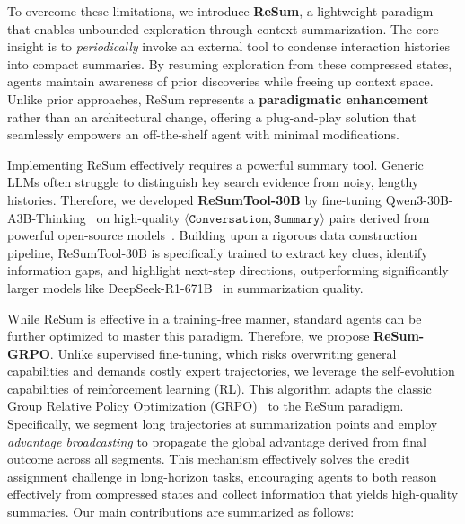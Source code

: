 To overcome these limitations, we introduce \textbf{ReSum}, a lightweight paradigm that enables unbounded exploration through context summarization. The core insight is to \emph{periodically} invoke an external tool to condense interaction histories into compact summaries. By resuming exploration from these compressed states, agents maintain awareness of prior discoveries while freeing up context space. Unlike prior approaches, ReSum represents a \textbf{paradigmatic enhancement} rather than an architectural change, offering a plug-and-play solution that seamlessly empowers an off-the-shelf agent with minimal modifications.

Implementing ReSum effectively requires a powerful summary tool. Generic LLMs often struggle to distinguish key search evidence from noisy, lengthy histories. Therefore, we developed \textbf{ReSumTool-30B} by fine-tuning Qwen3-30B-A3B-Thinking~\citep{qwen3technicalreport} on high-quality $\langle \texttt{Conversation}, \texttt{Summary} \rangle$ pairs derived from powerful open-source models~\citep{r1, gpt-oss}. Building upon a rigorous data construction pipeline, ReSumTool-30B is specifically trained to extract key clues, identify information gaps, and highlight next-step directions, outperforming significantly larger models like DeepSeek-R1-671B~\citep{r1} in summarization quality.

While ReSum is effective in a training-free manner, standard agents can be further optimized to master this paradigm. Therefore, we propose \textbf{ReSum-GRPO}. Unlike supervised fine-tuning, which risks overwriting general capabilities and demands costly expert trajectories, we leverage the self-evolution capabilities of reinforcement learning (RL). This algorithm adapts the classic Group Relative Policy Optimization (GRPO)~\citep{shao2024deepseekmath} to the ReSum paradigm. Specifically, we segment long trajectories at summarization points and employ \textit{advantage broadcasting} to propagate the global advantage derived from final outcome across all segments. This mechanism effectively solves the credit assignment challenge in long-horizon tasks, encouraging agents to both reason effectively from compressed states and collect information that yields high-quality summaries. Our main contributions are summarized as follows:

